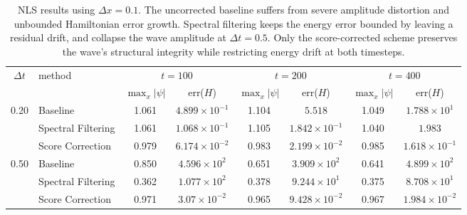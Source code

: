 \documentclass[letterpaper]{article} %
\begin{document}
\begin{table}[t]
    \centering
    \footnotesize
    \caption{NLS results using $\Delta x = 0.1$. The uncorrected baseline suffers from severe amplitude distortion and unbounded Hamiltonian error growth. Spectral filtering keeps the energy error bounded by leaving a residual drift, and collapse the wave amplitude at $\Delta t = 0.5$. Only the score-corrected scheme preserves the wave's structural integrity while restricting energy drift at both timesteps.}
    \label{tab:nls_marginal}
    \begin{tabular}{c l | c c | c c | c c}
    \hline
    \multirow{2}{*}{$\Delta t$} & \multirow{2}{*}{method} & \multicolumn{2}{c|}{$t = 100$} & \multicolumn{2}{c|}{$t = 200$} & \multicolumn{2}{c}{$t = 400$} \\
    \cline{3-8}
     & & \(\max_x|\psi|\) & err($H$) & \(\max_x|\psi|\) & err($H$) & \(\max_x|\psi|\) & err($H$) \\
    \hline
    \multirow{3}{*}{0.20} & Baseline & 1.061 & $4.899\!\times\!10^{-1}$ & 1.104 & $5.518$ & 1.049 & $1.788\!\times\!10^{1}$ \\
  & Spectral Filtering & 1.061 & $1.068\!\times\!10^{-1}$ & 1.105 & $1.842\!\times\!10^{-1}$ & 1.040 & $1.983$ \\
  & Score Correction     & 0.979 & $6.174\!\times\!10^{-2}$ & 0.983 & $2.199\!\times\!10^{-2}$ & 0.985 & $1.618\!\times\!10^{-1}$ \\
    \hline
    \multirow{3}{*}{0.50} & Baseline & 0.850 & $4.596\!\times\!10^{2}$ & 0.651 & $3.909\!\times\!10^{2}$ & 0.641 & $4.899\!\times\!10^{2}$ \\
  & Spectral Filtering & 0.362 & $1.077\!\times\!10^{2}$ & 0.378 & $9.244\!\times\!10^{1}$ & 0.375 & $8.708\!\times\!10^{1}$ \\
  & Score Correction     & 0.971 & $3.07\!\times\!10^{-2}$ & 0.965 & $9.428\!\times\!10^{-2}$ & 0.967 & $1.984\!\times\!10^{-2}$ \\
    \hline
    \end{tabular}
\end{table}
\end{document}
